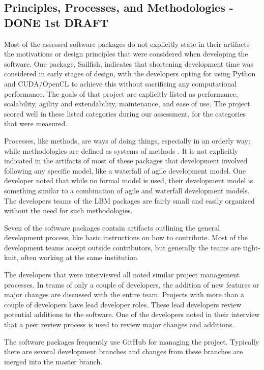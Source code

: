 \documentclass[12pt, notitlepage]{article}
\begin{document}
\subsection{Principles, Processes, and Methodologies - DONE 1st DRAFT}

Most of the assessed software packages do not explicitly state in their artifacts the motivations or design principles that were considered when developing the software. One package, Sailfish, indicates that shortening development time was considered in early stages of design, with the developers opting for using Python and CUDA/OpenCL to achieve this without sacrificing any computational performance. The goals of that project are explicitly listed as performance, scalability, agility and extendability, maintenance, and ease of use. The project scored well in these listed categories during our assessment, for the categories that were measured. 

Processes, like methods, are ways of doing things, especially in an orderly way; while methodologies are defined as systems of methods \citep{ghezzi1991fundamentals}. It is not explicitly indicated in the artifacts of most of these packages that development involved following any specific model, like a waterfall of agile development model. One developer noted that while no formal model is used, their development model is something similar to a combination of agile and waterfall development models. The developers teams of the LBM packages are fairly small and easily organized without the need for such methodologies. 

Seven of the software packages contain artifacts outlining the general development process, like basic instructions on how to contribute. Most of the development teams accept outside contributors, but generally the teams are tight-knit, often working at the same institution. 

The developers that were interviewed all noted similar project management processes. In teams of only a couple of developers, the addition of new features or major changes are discussed with the entire team. Projects with more than a couple of developers have lead developer roles. These lead developers review potential additions to the software. One of the developers noted in their interview that a peer review process is used to review major changes and additions.

The software packages frequently use GitHub for managing the project. Typically there are several development branches and changes from these branches are merged into the master branch. 
\end{document}
